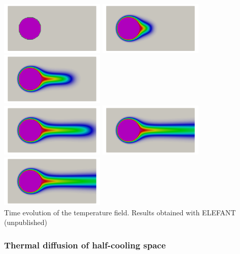 \begin{center}
\includegraphics[width=5cm]{images/benchmark_heatcyl/temper_0000}
\includegraphics[width=5cm]{images/benchmark_heatcyl/temper_0020}
\includegraphics[width=5cm]{images/benchmark_heatcyl/temper_0040}\\
\includegraphics[width=5cm]{images/benchmark_heatcyl/temper_0060}
\includegraphics[width=5cm]{images/benchmark_heatcyl/temper_0080}
\includegraphics[width=5cm]{images/benchmark_heatcyl/temper_0150}\\
{\captionfont Time evolution of the temperature field.
Results obtained with ELEFANT (unpublished)}
\end{center}


\subsubsection{Thermal diffusion of half-cooling space} \label{sec:hcsp}

